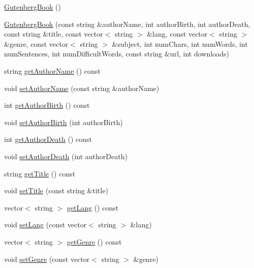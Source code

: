 \begin{DoxyCompactItemize}
\item 
\hyperlink{classbridges_1_1_gutenberg_book_a289c167dd11eed17cce39a59931f246c}{Gutenberg\+Book} ()
\item 
\hyperlink{classbridges_1_1_gutenberg_book_a9674a4cf8fa7cd35e640757261376793}{Gutenberg\+Book} (const string \&author\+Name, int author\+Birth, int author\+Death, const string \&title, const vector$<$ string $>$ \&lang, const vector$<$ string $>$ \&genre, const vector$<$ string $>$ \&subject, int num\+Chars, int num\+Words, int num\+Sentences, int num\+Difficult\+Words, const string \&url, int downloads)
\item 
string \hyperlink{classbridges_1_1_gutenberg_book_afacaf4beed079b9ac71622f1b24ff964}{get\+Author\+Name} () const 
\item 
void \hyperlink{classbridges_1_1_gutenberg_book_a40f8b184834c2cf816e3c06d6c6ca3f3}{set\+Author\+Name} (const string \&author\+Name)
\item 
int \hyperlink{classbridges_1_1_gutenberg_book_aca4767ac651f6bd056c3ae9dca394bad}{get\+Author\+Birth} () const 
\item 
void \hyperlink{classbridges_1_1_gutenberg_book_a33ac2e6063319064006fa72b6fcfb0dc}{set\+Author\+Birth} (int author\+Birth)
\item 
int \hyperlink{classbridges_1_1_gutenberg_book_a1a03188161b257b68fe667c4e95080c7}{get\+Author\+Death} () const 
\item 
void \hyperlink{classbridges_1_1_gutenberg_book_acf1e81a3b635fb939bc6af772a61fd3c}{set\+Author\+Death} (int author\+Death)
\item 
string \hyperlink{classbridges_1_1_gutenberg_book_a77e678b4fc06d6d64e75a80a8350ed05}{get\+Title} () const 
\item 
void \hyperlink{classbridges_1_1_gutenberg_book_a60968066e63898da03ae0a3b5741f19d}{set\+Title} (const string \&title)
\item 
vector$<$ string $>$ \hyperlink{classbridges_1_1_gutenberg_book_af1cbc9738f379426d259927595d3e7bb}{get\+Lang} () const 
\item 
void \hyperlink{classbridges_1_1_gutenberg_book_ab02303890adf0fc6ee8fc736c4a603c3}{set\+Lang} (const vector$<$ string $>$ \&lang)
\item 
vector$<$ string $>$ \hyperlink{classbridges_1_1_gutenberg_book_a33d4be418ed0322727797dfc9b81a88f}{get\+Genre} () const 
\item 
void \hyperlink{classbridges_1_1_gutenberg_book_a9536f2e24248b4ebd78ea4aac209a1af}{set\+Genre} (const vector$<$ string $>$ \&genre)

\end{DoxyCompactItemize}
